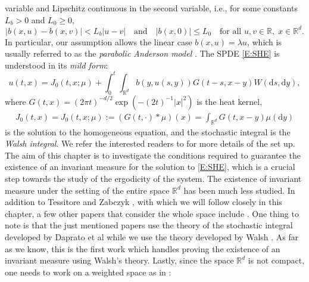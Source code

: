 \documentclass[12pt]{report}
\theoremstyle{plain}
\theoremstyle{definition}
\numberwithin{equation}{section}
\newcommand{\R}{\mathbb{R}}
\newcommand{\ud}{\ensuremath{ \mathrm{d} }}
\begin{document}
variable and Lipschitz continuous in the second variable, i.e., for some constants $L_b>0$ and $L_0\ge 0$,
\begin{equation} \label{E:lipcon}
|b(x,u)-b(x,v)|< L_b |u-v| \quad \text{and} \quad
|b(x,0)| \le L_0 \quad \text{for all } u,v \in \R, \; x \in \R^d.
\end{equation}
In particular, our assumption allows the linear case $b(x,u) = \lambda u$, which is usually referred
to as the \textit{parabolic Anderson model} \cite{carmona.molchanov:94:parabolic}. The SPDE
\eqref{E:SHE} is understood in its {\it mild form}:
\begin{equation} \label{E:gmsol}
u(t,x) = J_0(t,x;\mu)+ \int_0^t\int_{\R^d}b(y,u(s,y))G(t-s,x-y)W(\ud s,\ud y),
\end{equation}
where $G(t,x) = (2 \pi t)^{-d/2}\exp\left( -\left(2t\right)^{-1}|x|^2\right)$ is the heat kernel,
\begin{gather} \label{E:Ju}
J_0(t,x) = J_0(t,x;\mu) := (G(t,\cdot) * \mu)(x) = \int_{\R^d} G(t,x-y) \mu(\ud y)
\end{gather}
is the solution to the homogeneous equation, and the stochastic integral is the {\it Walsh
	integral}. We refer the interested readers to
\cite{walsh:86:introduction,dalang:99:extending,dalang.khoshnevisan.ea:09:minicourse,chen.kim:19:nonlinear}
for more details of the set up. \\


The aim of this chapter is to investigate the conditions required to guarantee the existence of an invariant measure for the solution to \eqref{E:SHE}, which is a crucial step towards the study of
the ergodicity of the system. The existence of invariant measure under the setting of the entire
space $\R^d$ has been much less studied. In addition to Tessitore and Zabczyk
\cite{tessitore.zabczyk:98:invariant}, with which we will follow closely in this chapter, a
few other papers that consider the whole space include \cite{assing.manthey:03:invariant, misiats.stanzhytskyi.ea:20:invariant,
	misiats.stanzhytskyi.ea:16:existence}. One thing to note is that the just mentioned papers use the theory of the stochastic integral developed by Daprato et al \cite{da-prato.zabczyk:14:stochastic} while we use the theory developed by Walsh \cite{walsh:86:introduction}. As far as we know, this is the first work which handles proving the existence of an invariant measure using Walsh's theory. Lastly,  since the space $\R^d$ is not compact, one needs to work on a
weighted space as in \cite{tessitore.zabczyk:98:invariant}:
\end{document}
